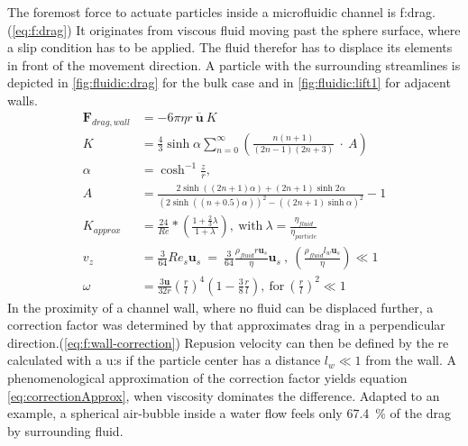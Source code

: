 The foremost force to actuate particles inside a microfluidic channel is \gls{f:drag}.(\cref{eq:f:drag}) It originates from viscous fluid moving past the sphere surface, where a slip condition has to be applied. The fluid therefor has to displace its elements in front of the movement direction.\cite{lit:fluidic:motion_sphere_to_plane_surface} A particle with the surrounding streamlines is depicted in \cref{fig:fluidic:drag} for the bulk case and in \cref{fig:fluidic:lift1} for adjacent walls. 
\begin{align}
	\mathbf{F}_{drag,wall} &= -6 \pi \eta r \ \overline{\mathbf{u}} \ K \label{eq:f:drag}\\
	K &=  \frac{4}{3} \sinh \alpha \sum_{n=0}^{\infty} \left(\frac{n(n+1)}{(2n-1)(2n+3)} \ \cdot \ A \right) \label{eq:f:wall-correction}\\
	\alpha &= \cosh^{-1}\frac{z}{r}, \\ A &= \frac{2 \sinh((2n+1)\alpha) + (2n+1)\sinh2\alpha}{(2\sinh((n+0.5)\alpha))^2 -((2n+1)\sinh\alpha)^2 }-1\\
	K_{approx} &= \frac{24}{\mathit{Re}} *\left(\frac{1+\frac{2}{3}\lambda}{1+\lambda}\right) ,\ \mathrm{with}\ \lambda = \frac{\eta_{fluid}}{ \eta_{particle}}\label{eq:correctionApprox} \\
	v_z &= \frac{3}{64} \mathit{Re}_s \mathbf{u}_s \ = \ \frac{3}{64} \frac{\rho_{fluid} r \mathbf{u}_s}{\eta} \mathbf{u}_s \ , \ (\frac{\rho_{fluid} l_w \mathbf{u}_s}{\eta}) \ll 1\label{eq:repulsion_v}\\
	\omega &= \frac{3 \mathbf{u}}{32 r}\left(\frac{r}{l}\right)^{4}\left(1-\frac{3}{8} \frac{r}{l}\right) \mathrm{, \ for \ } (\frac{r}{l})^2 \ll 1	\label{eq:angularFreq}
\end{align}
In the proximity of a channel wall, where no fluid can be displaced further, a correction factor was determined by \citet{lit:fluid:Hydrodynamics} that approximates drag in a perpendicular direction.(\cref{eq:f:wall-correction}) Repusion velocity can then be defined by the \acrlong{re} calculated with a \gls{u:s} if the particle center has a distance $l_w \ll 1$ from the wall.\cite{lit:fluid:velocities, lit:fluidic:motion_sphere_surface_2009} A phenomenological approximation of the correction factor yields equation \cref{eq:correctionApprox}, when viscosity dominates the difference. Adapted to an example, a spherical air-bubble inside a water flow feels only \SI{67.4}{\percent} of the drag by surrounding fluid.

\begin{figure}[!htb]
	\hfill
	\label{fig:fluidic:particleRotation}
\end{figure}

